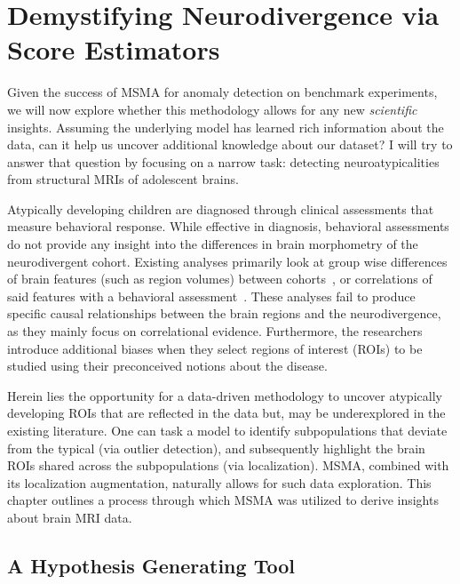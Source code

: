 \chapter{Demystifying Neurodivergence via Score Estimators }
\label{ch:localizing}

Given the success of MSMA for anomaly detection on benchmark experiments, we will now explore whether this methodology allows for any new \textit{scientific} insights.
Assuming the underlying model has learned rich information about the data, can it help us uncover additional knowledge about our dataset? I will try to answer that question by focusing on a narrow task: detecting neuroatypicalities from structural MRIs of adolescent brains.

Atypically developing children are diagnosed through clinical assessments that measure behavioral response. While effective in diagnosis, behavioral assessments do not provide any insight into the differences in brain morphometry of the neurodivergent cohort. Existing analyses primarily look at group wise differences of brain features (such as region volumes) between cohorts~\cite{giraultNeurodevelopmentAutismInfancy2020,hamnerPediatricBrainDevelopment2018}, or correlations of said features with a behavioral assessment~\cite{shenSubcorticalBrainDevelopment2022,brainsci12040439}. These analyses fail to produce specific causal relationships between the brain regions and the neurodivergence, as they mainly focus on correlational evidence.
Furthermore, the researchers introduce additional biases when they select regions of interest (ROIs) to be studied using their preconceived notions about the disease.

Herein lies the opportunity for a data-driven methodology to uncover atypically developing ROIs that are reflected in the data but, may be underexplored in the existing  literature. One can task a model to identify subpopulations that deviate from the typical (via outlier detection), and subsequently highlight the brain ROIs shared across the subpopulations (via localization).  MSMA, combined with its localization augmentation, naturally allows for such data exploration. This chapter outlines a process through which MSMA was utilized to derive insights about brain MRI data.

\section{A Hypothesis Generating Tool}

